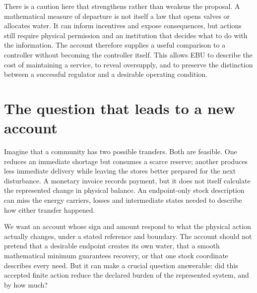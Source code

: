 There is a caution here that strengthens rather than weakens the proposal. A mathematical measure of departure is not itself a law that opens valves or allocates water. It can inform incentives and expose consequences, but actions still require physical permission and an institution that decides what to do with the information. The account therefore supplies a useful comparison to a controller without becoming the controller itself. This allows EBU to describe the cost of maintaining a service, to reveal oversupply, and to preserve the distinction between a successful regulator and a desirable operating condition.

\section{The question that leads to a new account}
Imagine that a community has two possible transfers. Both are feasible. One reduces an immediate shortage but consumes a scarce reserve; another produces less immediate delivery while leaving the stores better prepared for the next disturbance. A monetary invoice records payment, but it does not itself calculate the represented change in physical balance. An endpoint-only stock description can miss the energy carriers, losses and intermediate states needed to describe how either transfer happened.

We want an account whose sign and amount respond to what the physical action actually changes, under a stated reference and boundary. The account should not pretend that a desirable endpoint creates its own water, that a smooth mathematical minimum guarantees recovery, or that one stock coordinate describes every need. But it can make a crucial question answerable: did this accepted finite action reduce the declared burden of the represented system, and by how much?
